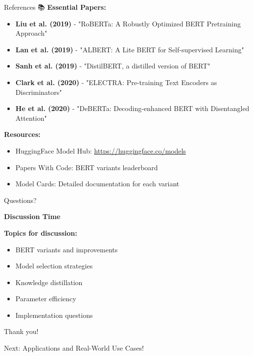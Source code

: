\documentclass[aspectratio=169]{beamer}
\begin{document}
\begin{frame}[shrink=10]{References 📚}
\textbf{Essential Papers:}

\vspace{0.5em}

\begin{itemize}\setlength{\itemsep}{0pt}
    \item \textbf{Liu et al. (2019)} - "RoBERTa: A Robustly Optimized BERT Pretraining Approach"
    \item \textbf{Lan et al. (2019)} - "ALBERT: A Lite BERT for Self-supervised Learning"
    \item \textbf{Sanh et al. (2019)} - "DistilBERT, a distilled version of BERT"
    \item \textbf{Clark et al. (2020)} - "ELECTRA: Pre-training Text Encoders as Discriminators"
    \item \textbf{He et al. (2020)} - "DeBERTa: Decoding-enhanced BERT with Disentangled Attention"
\end{itemize}

\vspace{0.5em}

\textbf{Resources:}
\begin{itemize}\setlength{\itemsep}{0pt}
    \item HuggingFace Model Hub: \url{https://huggingface.co/models}
    \item Papers With Code: BERT variants leaderboard
    \item Model Cards: Detailed documentation for each variant
\end{itemize}
\end{frame}

\begin{frame}{Questions? 🙋}
\begin{center}
\LARGE
\textbf{Discussion Time}
\end{center}

\vspace{1em}

\textbf{Topics for discussion:}
\begin{itemize}\setlength{\itemsep}{0pt}
    \item BERT variants and improvements
    \item Model selection strategies
    \item Knowledge distillation
    \item Parameter efficiency
    \item Implementation questions
\end{itemize}

\vspace{1em}

\begin{center}
\Large
Thank you! 🙏

\vspace{1em}

Next: Applications and Real-World Use Cases!
\end{center}
\end{frame}
\end{document}
